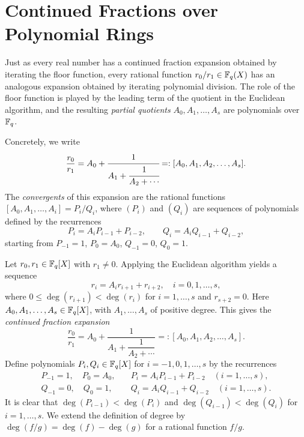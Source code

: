 \chapter{Continued Fractions over Polynomial Rings}
\label{sec:cont-frac-fq}

Just as every real number has a continued fraction expansion obtained by iterating the floor function, every rational function $r_0/r_1\in\mathbb{F}_q(X)$ has an analogous expansion obtained by iterating polynomial division. The role of the floor function is played by the leading term of the quotient in the Euclidean algorithm, and the resulting \emph{partial quotients} $A_0, A_1, \ldots, A_s$ are polynomials over $\mathbb{F}_q$.

Concretely, we write
\[
  \frac{r_0}{r_1} = A_0 + \cfrac{1}{A_1 + \cfrac{1}{A_2 + \cdots}} =: [A_0, A_1, A_2, \ldots, A_s].
\]
The \emph{convergents} of this expansion are the rational functions $[A_0, A_1, \ldots, A_i] = P_i/Q_i$, where $(P_i)$ and $(Q_i)$ are sequences of polynomials defined by the recurrences
\[
  P_{i} = A_i P_{i-1} + P_{i-2}, \qquad Q_{i} = A_i Q_{i-1} + Q_{i-2},
\]
starting from $P_{-1} = 1$, $P_0 = A_0$, $Q_{-1} = 0$, $Q_0 = 1$.

\medskip
Let $r_0,r_1\in\mathbb{F}_q[X]$ with $r_1\neq 0$. Applying the Euclidean algorithm yields a sequence
$$r_i=A_ir_{i+1}+r_{i+2},\quad i=0,1,\dots,s,$$
where $0\leq\deg(r_{i+1})<\deg(r_i)$ for $i=1,\dots,s$ and $r_{s+2}=0$. Here $A_0,A_1,\dots,A_s\in\mathbb{F}_q[X]$, with $A_1,\dots,A_s$ of positive degree. This gives the \emph{continued fraction expansion}
$$\frac{r_0}{r_1}=A_0+\dfrac{1}{A_1+\dfrac{1}{A_2+\cdots}}=:[A_0,A_1,A_2,\dots,A_s].$$
Define polynomials $P_i,Q_i\in\mathbb{F}_q[X]$ for $i=-1,0,1,\dots,s$ by the recurrences
\begin{align*}
  P_{-1}=1,\quad P_0=A_0,\quad & P_i=A_iP_{i-1}+P_{i-2}\quad (i=1,\dots,s), \\
  Q_{-1}=0,\quad Q_0=1,\quad   & Q_i=A_iQ_{i-1}+Q_{i-2}\quad (i=1,\dots,s).
\end{align*}
It is clear that $\deg(P_{i-1})<\deg(P_i)$ and $\deg(Q_{i-1})<\deg(Q_i)$ for $i=1,\dots,s$. We extend the definition of degree by $\deg(f/g)=\deg(f)-\deg(g)$ for a rational function $f/g$.

